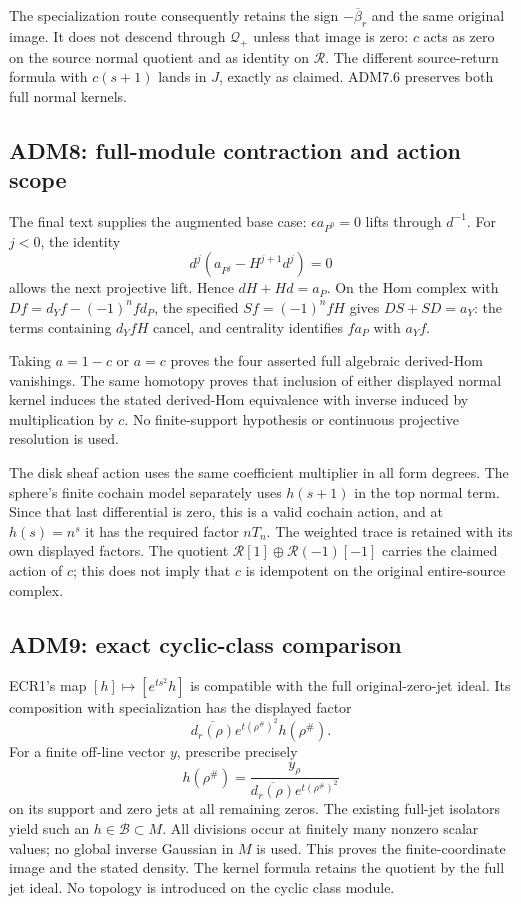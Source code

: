 The specialization route consequently retains the sign
\(-\overline\beta_r\) and the same original image. It does not descend
through \(\mathcal Q_+\) unless that image is zero: \(c\) acts as zero
on the source normal quotient and as identity on \(\mathcal R\). The
different source-return formula with \(c(s+1)\) lands in \(J\), exactly
as claimed. ADM7.6 preserves both full normal kernels.

\subsection{ADM8: full-module contraction and action
scope}\label{adm8-full-module-contraction-and-action-scope}

The final text supplies the augmented base case: \(\epsilon a_{P^0}=0\)
lifts through \(d^{-1}\). For \(j<0\), the identity \[
d^j(a_{P^j}-H^{j+1}d^j)=0
\] allows the next projective lift. Hence \(dH+Hd=a_P\). On the Hom
complex with \(Df=d_Yf-(-1)^nfd_P\), the specified \(Sf=(-1)^nfH\) gives
\(DS+SD=a_Y\): the terms containing \(d_YfH\) cancel, and centrality
identifies \(fa_P\) with \(a_Yf\).

Taking \(a=1-c\) or \(a=c\) proves the four asserted full algebraic
derived-Hom vanishings. The same homotopy proves that inclusion of
either displayed normal kernel induces the stated derived-Hom
equivalence with inverse induced by multiplication by \(c\). No
finite-support hypothesis or continuous projective resolution is used.

The disk sheaf action uses the same coefficient multiplier in all form
degrees. The sphere's finite cochain model separately uses \(h(s+1)\) in
the top normal term. Since that last differential is zero, this is a
valid cochain action, and at \(h(s)=n^s\) it has the required factor
\(nT_n\). The weighted trace is retained with its own displayed factors.
The quotient \(\mathcal R[1]\oplus\mathcal R(-1)[-1]\) carries the
claimed action of \(c\); this does not imply that \(c\) is idempotent on
the original entire-source complex.

\subsection{ADM9: exact cyclic-class
comparison}\label{adm9-exact-cyclic-class-comparison}

ECR1's map \([h]\mapsto[e^{ts^2}h]\) is compatible with the full
original-zero-jet ideal. Its composition with specialization has the
displayed factor \[
\overline{d_r(\rho)}e^{t(\rho^\#)^2}h(\rho^\#).
\] For a finite off-line vector \(y\), prescribe precisely \[
h(\rho^\#)
=\frac{y_\rho}{\overline{d_r(\rho)}e^{t(\rho^\#)^2}}
\] on its support and zero jets at all remaining zeros. The existing
full-jet isolators yield such an \(h\in\mathcal B\subset M\). All
divisions occur at finitely many nonzero scalar values; no global
inverse Gaussian in \(M\) is used. This proves the finite-coordinate
image and the stated density. The kernel formula retains the quotient by
the full jet ideal. No topology is introduced on the cyclic class
module.

